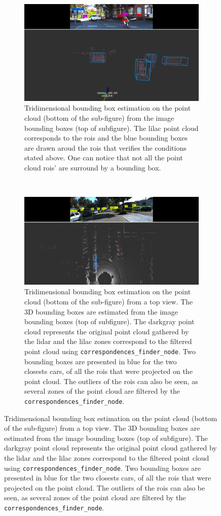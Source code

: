 \begin{figure}[ht!]\ContinuedFloat
	\centering	
	\begin{subfigure}[c]{0.8\textwidth}
		\includegraphics[width=\textwidth]{img/image-object-to-point-cloud/bboxes-front-view.png}
		\caption{Tridimensional bounding box estimation on the point cloud (bottom of the sub-figure) from the image bounding boxes (top of subfigure). The lilac point cloud corresponds to the \acp{roi} and the blue bounding boxes are drawn aroud the \acp{roi} that verifies the conditions stated above. One can notice that not all the point cloud \acp{roi}' are surround by a bounding box.}
		\label{fig:bboxes-3d-kitti-front}
	\end{subfigure}
	\\ \vspace{4mm}
	\begin{subfigure}[c]{0.8\textwidth}
		\includegraphics[width=\textwidth]{img/image-object-to-point-cloud/bboxes-top-view.png}
		\caption{Tridimensional bounding box estimation on the point cloud (bottom of the sub-figure) from a top view. The 3D bounding boxes are estimated from the image bounding boxes (top of subfigure). The darkgray point cloud represents the original point cloud gathered by the \ac{lidar} and the lilac zones correspond to the filtered point cloud using \texttt{correspondences\_finder\_node}. Two bounding boxes are presented in blue for the two closests cars, of all the \acp{roi} that were projected on the point cloud. The outliers of the \acp{roi} can also be seen, as several zones of the point cloud are filtered by the \texttt{correspondences\_finder\_node}.}

\end{subfigure}
\end{figure}
